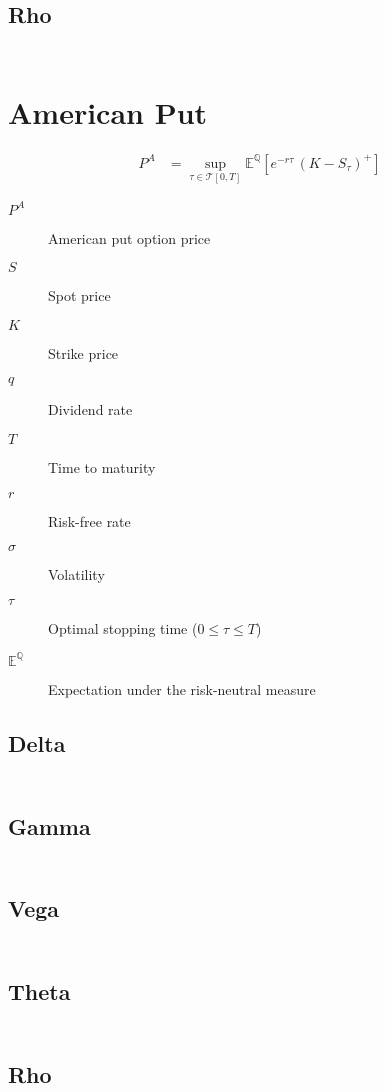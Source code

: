 \documentclass[12pt,a4paper]{article}
\begin{document}
\subsection{Rho}
\[
  \begin{aligned}
  \end{aligned}
\]

\newpage

\section{American Put}

\[
  \begin{aligned}
    P^{A} & = \sup_{\tau \in \mathcal{T}[0,T]} \mathbb{E}^{\mathbb{Q}}\!\left[ e^{-r \tau}\,(K-S_{\tau})^{+} \right]
  \end{aligned}
\]

\begin{description}
  \item[$P^{A}$] American put option price
  \item[$S$] Spot price
  \item[$K$] Strike price
  \item[$q$] Dividend rate
  \item[$T$] Time to maturity
  \item[$r$] Risk-free rate
  \item[$\sigma$] Volatility
  \item[$\tau$] Optimal stopping time (\( 0 \le \tau \le T \))
  \item[$\mathbb{E}^{\mathbb{Q}}$] Expectation under the risk-neutral measure
\end{description}

\subsection{Delta}
\[
  \begin{aligned}
  \end{aligned}
\]

\subsection{Gamma}
\[
  \begin{aligned}
  \end{aligned}
\]

\subsection{Vega}
\[
  \begin{aligned}
  \end{aligned}
\]

\subsection{Theta}
\[
  \begin{aligned}
  \end{aligned}
\]

\subsection{Rho}
\[
  \begin{aligned}
  \end{aligned}
\]
\end{document}
